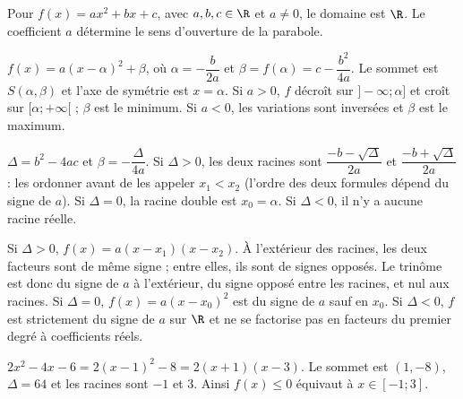 
\begin{definition}
Pour $f(x)=ax^2+bx+c$, avec $a,b,c\in\R$ et $a\neq0$, le domaine est $\R$. Le coefficient $a$ détermine le sens d’ouverture de la parabole.
\end{definition}

\begin{theorem}
$f(x)=a(x-\alpha)^2+\beta$, où $\alpha=-\dfrac{b}{2a}$ et $\beta=f(\alpha)=c-\dfrac{b^2}{4a}$. Le sommet est $S(\alpha,\beta)$ et l’axe de symétrie est $x=\alpha$. Si $a>0$, $f$ décroît sur $]-\infty;\alpha]$ et croît sur $[\alpha;+\infty[$ ; $\beta$ est le minimum. Si $a<0$, les variations sont inversées et $\beta$ est le maximum.
\end{theorem}

\begin{theorem}
$\Delta=b^2-4ac$ et $\beta=-\dfrac{\Delta}{4a}$. Si $\Delta>0$, les deux racines sont $\dfrac{-b-\sqrt\Delta}{2a}$ et $\dfrac{-b+\sqrt\Delta}{2a}$ : les ordonner avant de les appeler $x_1<x_2$ (l’ordre des deux formules dépend du signe de $a$). Si $\Delta=0$, la racine double est $x_0=\alpha$. Si $\Delta<0$, il n’y a aucune racine réelle.
\end{theorem}

\begin{keypoint}
Si $\Delta>0$, $f(x)=a(x-x_1)(x-x_2)$. À l’extérieur des racines, les deux facteurs sont de même signe ; entre elles, ils sont de signes opposés. Le trinôme est donc du signe de $a$ à l’extérieur, du signe opposé entre les racines, et nul aux racines. Si $\Delta=0$, $f(x)=a(x-x_0)^2$ est du signe de $a$ sauf en $x_0$. Si $\Delta<0$, $f$ est strictement du signe de $a$ sur $\R$ et ne se factorise pas en facteurs du premier degré à coefficients réels.
\end{keypoint}

\begin{example}
$2x^2-4x-6=2(x-1)^2-8=2(x+1)(x-3)$. Le sommet est $(1,-8)$, $\Delta=64$ et les racines sont $-1$ et $3$. Ainsi $f(x)\leq0$ équivaut à $x\in[-1;3]$.
\end{example}

\begin{figurebox}
\end{figurebox}

